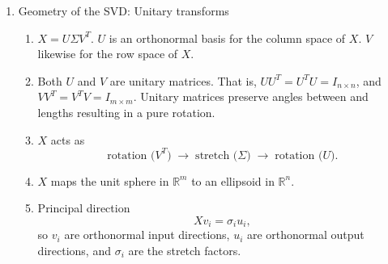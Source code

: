 \documentclass{article}
\begin{document}
\begin{enumerate}
\begin{enumerate}
\begin{enumerate}
\item Find eigenvectors $v_i$ and eigenvalues $\lambda_i \ge 0$ of $X^T X$:
\[
X^T X v_i = \lambda_i v_i, \quad i=1,\dots,r.
\]

\item Define singular values:
\[
\sigma_i = \sqrt{\lambda_i} \ge 0.
\]

\item Compute left singular vectors:
\[
u_i = \frac{X v_i}{\sigma_i} \in \mathbb{R}^n \quad \Rightarrow \quad X v_i = \sigma_i u_i.
\]

\item Assemble SVD:
\[
X = U \Sigma V^T
\]
where
\begin{itemize}
\item $U = [u_1, \dots, u_r] \in \mathbb{R}^{n \times r}$,
\item $V = [v_1, \dots, v_r] \in \mathbb{R}^{m \times r}$,
\item $\Sigma = \mathrm{diag}(\sigma_1, \dots, \sigma_r) \in \mathbb{R}^{r \times r}$,
\end{itemize}
and $r = \mathrm{rank}(X)$.
\end{enumerate} 
Extend $U$ and $V$ to orthonormal bases for $\mathbb{R}^n$ and $\mathbb{R}^m$ to get a full SVD.

\end{enumerate}

\item Geometry of the SVD: Unitary transforms
\begin{enumerate}
\item $X = U \Sigma V^T$. $U$ is an orthonormal basis for the column space of $X$. $V$ likewise for the row space of $X$.
\item Both $U$ and $V$ are unitary matrices. That is, $U U^T = U^T U = I_{n \times n}$, and $V V^T = V^T V = I_{m \times m}$. Unitary matrices preserve angles between and lengths resulting in a pure rotation.

\item $X$ acts as
\[
\text{rotation (}V^T\text{)} \;\rightarrow\; \text{stretch (}\Sigma\text{)} \;\rightarrow\; \text{rotation (}U\text{)}.
\]

\item $X$ maps the unit sphere in $\mathbb{R}^m$ to an ellipsoid in $\mathbb{R}^n$.

\item Principal direction
\[
X v_i = \sigma_i u_i,
\]
so $v_i$ are orthonormal input directions, $u_i$ are orthonormal output directions, and $\sigma_i$ are the stretch factors.


\end{enumerate}
\end{enumerate}
\end{document}
